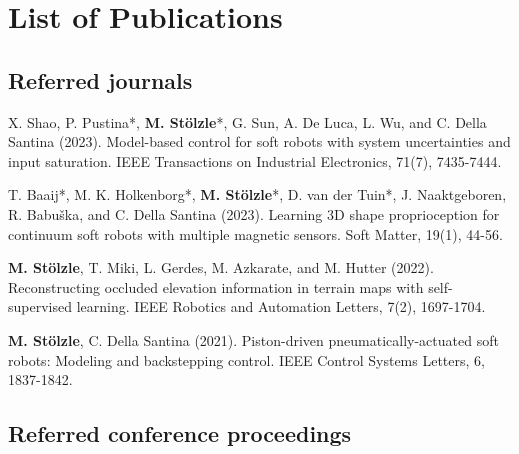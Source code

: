\chapter*{List of Publications}
\label{publications}

\section*{Referred journals}

\begin{itemize}{
  \item X. Shao, P. Pustina*, \textbf{M. Stölzle}*, G. Sun, A. De Luca, L. Wu, and C. Della Santina (2023). Model-based control for soft robots with system uncertainties and input saturation. IEEE Transactions on Industrial Electronics, 71(7), 7435-7444.
  \item[\faFileTextO] T. Baaij*, M. K. Holkenborg*, \textbf{M. Stölzle}*, D. van der Tuin*, J. Naaktgeboren, R. Babuška, and C. Della Santina (2023). Learning 3D shape proprioception for continuum soft robots with multiple magnetic sensors. Soft Matter, 19(1), 44-56.
  \item \textbf{M. Stölzle}, T. Miki, L. Gerdes, M. Azkarate, and M. Hutter (2022). Reconstructing occluded elevation information in terrain maps with self-supervised learning. IEEE Robotics and Automation Letters, 7(2), 1697-1704.
  \item[\faFileTextO] \textbf{M. Stölzle}, C. Della Santina (2021). Piston-driven pneumatically-actuated soft robots: Modeling and backstepping control. IEEE Control Systems Letters, 6, 1837-1842.
}\end{itemize}


\section*{Referred conference proceedings}

